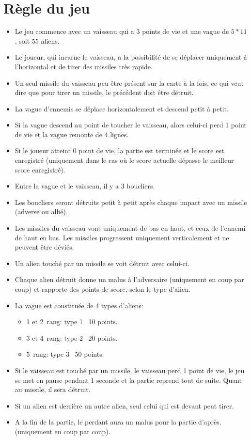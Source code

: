 \documentclass[french, 11pt]{report}
\begin{document}
	\section{Règle du jeu}
		\begin{itemize}
			\item Le jeu commence avec un vaisseau qui a 3 points de vie et une vague de $5 * 11$, soit 55 aliens.
			\item Le joueur, qui incarne le vaisseau, a la possibilité de se déplacer uniquement à l'horizontal et de tirer des missiles très rapide.
			\item Un seul missile du vaisseau peu être présent sur la carte à la fois, ce qui veut dire que pour tirer un missile, le précédent doit être détruit.
			\item La vague d'ennemis se déplace horizontalement et descend petit à petit.
			\item Si la vague descend au point de toucher le vaisseau, alors celui-ci perd 1 point de vie et la vague remonte de 4 lignes.
			\item Si le joueur atteint 0 point de vie, la partie est terminée et le score est enregistré (uniquement dans le cas où le score actuelle dépasse le meilleur score enregistré).
			\item Entre la vague et le vaisseau, il y a 3 boucliers.
			\item Les boucliers seront détruits petit à petit après chaque impact avec un missile (adverse ou allié).
			\item Les missiles du vaisseau vont uniquement de bas en haut, et ceux de l'ennemi de haut en bas. Les missiles progressent uniquement verticalement et ne peuvent être déviés.
			\item Un alien touché par un missile se voit détruit avec celui-ci.
			\item Chaque alien détruit donne un malus à l'adversaire (uniquement en coup par coup) et rapporte des points de score, selon le type d'alien.
			\item La vague est constituée de 4 types d'aliens:
			\begin{itemize}
				\item 1\ier{} et 2\ieme{}~rang: type 1 \textrightarrow~10 points.
				\item 3\ieme{} et 4\ieme{}~rang: type 2 \textrightarrow~20 points.
				\item 5\ieme{}~rang: type 3 \textrightarrow~50 points.
			\end{itemize}
			\item Si le vaisseau est touché par un missile, le vaisseau perd 1 point de vie, le jeu se met en pause pendant 1 seconde et la partie reprend tout de suite. Quant au missile, il sera détruit.
			\item Si un alien est derrière un autre alien, seul celui qui est devant peut tirer.
			\item A la fin de la partie, le perdant aura un malus pour la partie d'après. (uniquement en coup par coup).
		\end{itemize}
\end{document}
